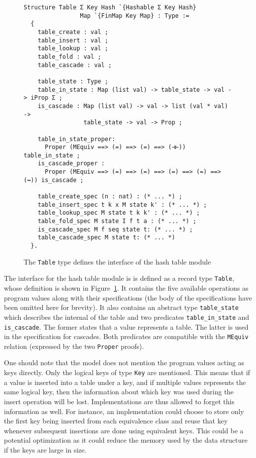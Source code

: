 \documentclass[10pt,a4paper]{article}
\begin{document}
\begin{figure}
\begin{verbatim}
Structure Table Σ Key Hash `{Hashable Σ Key Hash}
                Map `{FinMap Key Map} : Type :=
  { 
    table_create : val ;
    table_insert : val ;
    table_lookup : val ;
    table_fold : val ;
    table_cascade : val ;

    table_state : Type ;
    table_in_state : Map (list val) -> table_state -> val -> iProp Σ ;
    is_cascade : Map (list val) -> val -> list (val * val) ->
                 table_state -> val -> Prop ;
	
    table_in_state_proper: 
      Proper (MEquiv ==> (=) ==> (=) ==> (⊣⊢)) table_in_state ;
    is_cascade_proper : 
      Proper (MEquiv ==> (=) ==> (=) ==> (=) ==> (=) ==> (↔)) is_cascade ;
    
    table_create_spec (n : nat) : (* ... *) ;
    table_insert_spec t k x M state k' : (* ... *) ;
    table_lookup_spec M state t k k' : (* ... *) ;
    table_fold_spec M state I f t a : (* ... *) ;
    is_cascade_spec M f seq state t: (* ... *) ;
    table_cascade_spec M state t: (* ... *)
  }.
\end{verbatim}
\caption{The \texttt{Table} type defines the interface of the hash table module}
\label{fig:interface}
\end{figure}
The interface for the hash table module is is defined as a record type \texttt{Table}, whose definition is shown in Figure~\ref{fig:interface}. It contains the five available operations as program values along with their specifications (the body of the specifications have been omitted here for brevity). It also contains an abstract type \texttt{table\_state} which describes the internal of the table and two predicates \texttt{table\_in\_state} and \texttt{is\_cascade}. The former states that a value represents a table. The latter is used in the specification for cascades. Both predicates are compatible with the \texttt{MEquiv} relation (expressed by the two \texttt{Proper} proofs).

One should note that the model does not mention the program values acting as keys directly. Only the logical keys of type \texttt{Key} are mentioned. This means that if a value is inserted into a table under a key, and if multiple values represents the same logical key, then the information about which key was used during the insert operation will be lost. Implementations are thus allowed to forget this information as well. For instance, an implementation could choose to store only the first key being inserted from each equivalence class and reuse that key whenever subsequent insertions are done using equivalent keys. This could be a potential optimization as it could reduce the memory used by the data structure if the keys are large in size.
\end{document}
